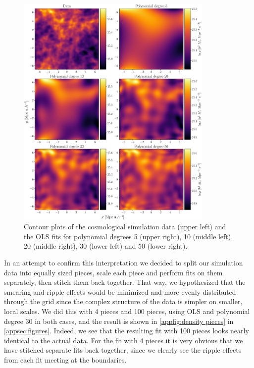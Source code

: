 \documentclass[aps,pra,english,notitlepage,reprint,nofootinbib]{revtex4-1}  %
\begin{document}
\begin{figure}
  \vspace*{-5pt}
  \centering %
  \includegraphics[width=0.85\textwidth]{../figs/density_complexity.pdf}
  \caption{Contour plots of the cosmological simulation data (upper left) and the OLS fits for polynomial degrees 5 (upper right), 10 (middle left), 20 (middle right), 30 (lower left) and 50 (lower right).}\label{fig:density complexity}
  \vspace*{-5pt}
\end{figure}

In an attempt to confirm this interpretation we decided to split our simulation data into equally sized pieces, scale each piece and perform fits on them separately, then stitch them back together. That way, we hypothesized that the smearing and ripple effects would be minimized and more evenly distributed through the grid since the complex structure of the data is simpler on smaller, local scales. We did this with 4 pieces and 100 pieces, using OLS and polynomial degree 30 in both cases, and the result is shown in \cref{appfig:density pieces} in \cref{appsec:figures}. Indeed, we see that the resulting fit with 100 pieces looks nearly identical to the actual data. For the fit with 4 pieces it is very obvious that we have stitched separate fits back together, since we clearly see the ripple effects from each fit meeting at the boundaries.
\end{document}
